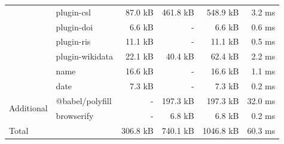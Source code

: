 \documentclass[fleqn,10pt,lineno]{wlpeerj} %
\begin{document}
\begin{table}[bt!]
\begin{tabular}{|l|l|r|r|r|r|}
                                 & plugin-csl        & 87.0 kB                           & 461.8 kB                                   & 548.9 kB                            & 3.2 ms                                                      \\ \cline{2-6} 
                                 & plugin-doi        & 6.6 kB                            & -                                          & 6.6 kB                              & 0.6 ms                                                      \\ \cline{2-6} 
                                 & plugin-ris        & 11.1 kB                           & -                                          & 11.1 kB                             & 0.5 ms                                                      \\ \cline{2-6} 
                                 & plugin-wikidata   & 22.1 kB                           & 40.4 kB                                    & 62.4 kB                             & 2.2 ms                                                      \\ \cline{2-6} 
                                 & name              & 16.6 kB                           & -                                          & 16.6 kB                             & 1.1 ms                                                      \\ \cline{2-6} 
                                 & date              & 7.3 kB                            & -                                          & 7.3 kB                              & 0.2 ms                                                      \\ \hline
\multirow{2}{*}{Additional}      & @babel/polyfill   & -                                 & 197.3 kB                                   & 197.3 kB                            & 32.0 ms                                                     \\ \cline{2-6} 
                                 & browserify        & -                                 & 6.8 kB                                     & 6.8 kB                              & 0.2 ms                                                      \\ \hline
\multicolumn{2}{|l|}{Total}                          & 306.8 kB                          & 740.1 kB                                   & 1046.8 kB                           & 60.3 ms                                                     \\ \hline
\end{tabular}
\end{table}
\end{document}
